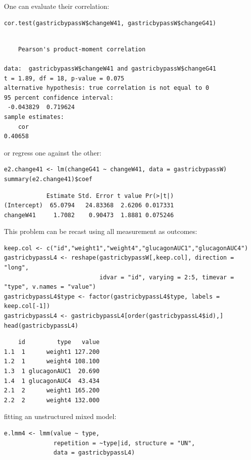 \documentclass[12pt]{article}
\begin{document}
\bigskip

One can evaluate their correlation:
\lstset{language=r,label= ,caption= ,captionpos=b,numbers=none}
\begin{lstlisting}
cor.test(gastricbypassW$changeW41, gastricbypassW$changeG41)
\end{lstlisting}

\begin{verbatim}

	Pearson's product-moment correlation

data:  gastricbypassW$changeW41 and gastricbypassW$changeG41
t = 1.89, df = 18, p-value = 0.075
alternative hypothesis: true correlation is not equal to 0
95 percent confidence interval:
 -0.043829  0.719624
sample estimates:
    cor 
0.40658
\end{verbatim}

or regress one against the other:
\lstset{language=r,label= ,caption= ,captionpos=b,numbers=none}
\begin{lstlisting}
e2.change41 <- lm(changeG41 ~ changeW41, data = gastricbypassW)
summary(e2.change41)$coef
\end{lstlisting}

\begin{verbatim}
            Estimate Std. Error t value Pr(>|t|)
(Intercept)  65.0794   24.83368  2.6206 0.017331
changeW41     1.7082    0.90473  1.8881 0.075246
\end{verbatim}


This problem can be recast using all measurement as outcomes:
\lstset{language=r,label= ,caption= ,captionpos=b,numbers=none}
\begin{lstlisting}
keep.col <- c("id","weight1","weight4","glucagonAUC1","glucagonAUC4")
gastricbypassL4 <- reshape(gastricbypassW[,keep.col], direction = "long",
                           idvar = "id", varying = 2:5, timevar = "type", v.names = "value")
gastricbypassL4$type <- factor(gastricbypassL4$type, labels = keep.col[-1])
gastricbypassL4 <- gastricbypassL4[order(gastricbypassL4$id),]
head(gastricbypassL4)
\end{lstlisting}

\begin{verbatim}
    id         type   value
1.1  1      weight1 127.200
1.2  1      weight4 108.100
1.3  1 glucagonAUC1  20.690
1.4  1 glucagonAUC4  43.434
2.1  2      weight1 165.200
2.2  2      weight4 132.000
\end{verbatim}


fitting an unstructured mixed model:
\lstset{language=r,label= ,caption= ,captionpos=b,numbers=none}
\begin{lstlisting}
e.lmm4 <- lmm(value ~ type,
              repetition = ~type|id, structure = "UN",
              data = gastricbypassL4)
\end{lstlisting}
\end{document}
